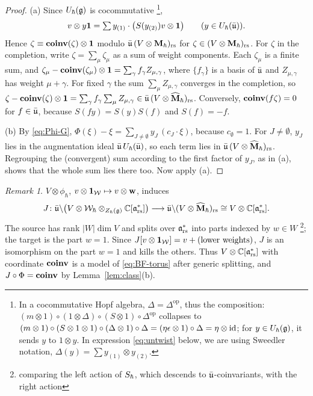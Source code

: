 \documentclass{article}
\theoremstyle{plain}
\theoremstyle{definition}
\theoremstyle{remark}
\newtheorem{remark}[theorem]{Remark}
\numberwithin{equation}{section}
\begin{document}
\begin{proof}
(a) Since $U_\hbar(\mathfrak{g})$ is cocommutative \footnote{In a cocommutative Hopf algebra, $\Delta = \Delta^{\operatorname{op}}$, thus the composition: $(m\otimes 1) \circ (1\otimes \Delta) \circ (S \otimes 1) \circ \Delta^{\operatorname{op}}$ collapses to $(m\otimes 1) \circ (S \otimes 1\otimes 1) \circ (\Delta \otimes 1) \circ \Delta = (\eta \epsilon \otimes 1)\circ \Delta = \eta \otimes \operatorname{id}$; for $y \in U_\hbar(\mathfrak{g})$, it sends $y$ to $1\otimes y$. In expression \eqref{eq:untwist} below, we are using Sweedler notation, $\Delta (y) = \sum y_{(1)} \otimes y_{(2)}$. },
\begin{equation}\label{eq:untwist}
v\otimes y\mathbf 1=\textstyle\sum y_{(1)}\cdot\bigl(S(y_{(2)})v\otimes\mathbf 1\bigr)\qquad(y\in U_\hbar(\bar{\mathfrak u})).
\end{equation}
Hence $\zeta\equiv\operatorname{\mathbf{coinv}}(\zeta)\otimes\mathbf 1$ modulo $\bar{\mathfrak u}\,(V\otimes\mathbf{M}_\hbar)_{\mathrm{rs}}$ for $\zeta\in(V\otimes\mathbf{M}_\hbar)_{\mathrm{rs}}$. For $\zeta$ in the completion, write $\zeta=\sum_\mu\zeta_\mu$ as a sum of weight components. Each $\zeta_\mu$ is a finite sum, and $\zeta_\mu-\operatorname{\mathbf{coinv}}(\zeta_\mu)\otimes\mathbf 1=\sum_\gamma f_\gamma Z_{\mu,\gamma}$, where $\{f_\gamma\}$ is a basis of $\bar{\mathfrak u}$ and $Z_{\mu,\gamma}$ has weight $\mu+\gamma$. For fixed $\gamma$ the sum $\sum_\mu Z_{\mu,\gamma}$ converges in the completion, so $\zeta-\operatorname{\mathbf{coinv}}(\zeta)\otimes\mathbf 1=\sum_\gamma f_\gamma\sum_\mu Z_{\mu,\gamma}\in\bar{\mathfrak u}\,(V\otimes\widehat{\mathbf M}_\hbar)_{\mathrm{rs}}$. Conversely, $\operatorname{\mathbf{coinv}}(f\zeta)=0$ for $f\in\bar{\mathfrak u}$, because $S(fy)=S(y)S(f)$ and $S(f)=-f$.

(b) By \eqref{eq:Phi-G}, $\Phi(\xi)-\xi=\sum_{J\neq\emptyset}y_J\,(c_J\cdot\xi)$, because $c_\emptyset=1$. For $J\neq\emptyset$, $y_J$ lies in the augmentation ideal $\bar{\mathfrak u}\,U_\hbar(\bar{\mathfrak u})$, so each term lies in $\bar{\mathfrak u}\,(V\otimes\widehat{\mathbf M}_\hbar)_{\mathrm{rs}}$. Regrouping the (convergent) sum according to the first factor of $y_J$, as in (a), shows that the whole sum lies there too. Now apply (a).
\end{proof}

\begin{remark}\label{rem:model}
$V\otimes\phi_\hbar$, $v\otimes\mathbf 1_{\mathcal{W}}\mapsto v\otimes\mathbf w$, induces
\[
J\colon\bar{\mathfrak u}\backslash\bigl(V\otimes\mathcal{W}_\hbar\otimes_{Z_\hbar(\mathfrak{g})}\mathbb{C}[\mathfrak{a}^*_{\mathrm{rs}}]\bigr)\longrightarrow\bar{\mathfrak u}\backslash(V\otimes\widehat{\mathbf M}_\hbar)_{\mathrm{rs}}\cong V\otimes\mathbb{C}[\mathfrak{a}^*_{\mathrm{rs}}] .
\]
The source has rank $|W|\dim V$ and splits over $\mathfrak{a}^*_{\mathrm{rs}}$ into parts indexed by $w\in W$ \footnote{comparing the left action of $S_\hbar$, which descends to $\bar{\mathfrak{u}}$-coinvariants, with the right action}; the target is the part $w=1$. Since $J[v\otimes\mathbf 1_{\mathcal{W}}]=v+(\text{lower weights})$, $J$ is an isomorphism on the part $w=1$ and kills the others. Thus $V\otimes\mathbb{C}[\mathfrak{a}^*_{\mathrm{rs}}]$ with coordinate $\operatorname{\mathbf{coinv}}$ is a model of \eqref{eq:BF-torus} after generic splitting, and $J\circ\Phi=\operatorname{\mathbf{coinv}}$ by Lemma~\ref{lem:class}(b).
\end{remark}
\end{document}
